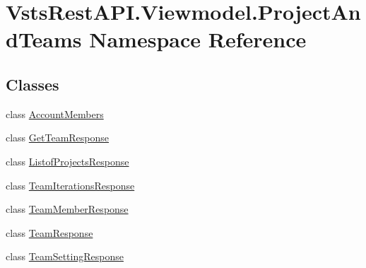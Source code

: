 \hypertarget{namespace_vsts_rest_a_p_i_1_1_viewmodel_1_1_project_and_teams}{}\section{Vsts\+Rest\+A\+P\+I.\+Viewmodel.\+Project\+And\+Teams Namespace Reference}
\label{namespace_vsts_rest_a_p_i_1_1_viewmodel_1_1_project_and_teams}
\subsection*{Classes}
\begin{DoxyCompactItemize}
\item 
class \mbox{\hyperlink{class_vsts_rest_a_p_i_1_1_viewmodel_1_1_project_and_teams_1_1_account_members}{Account\+Members}}
\item 
class \mbox{\hyperlink{class_vsts_rest_a_p_i_1_1_viewmodel_1_1_project_and_teams_1_1_get_team_response}{Get\+Team\+Response}}
\item 
class \mbox{\hyperlink{class_vsts_rest_a_p_i_1_1_viewmodel_1_1_project_and_teams_1_1_listof_projects_response}{Listof\+Projects\+Response}}
\item 
class \mbox{\hyperlink{class_vsts_rest_a_p_i_1_1_viewmodel_1_1_project_and_teams_1_1_team_iterations_response}{Team\+Iterations\+Response}}
\item 
class \mbox{\hyperlink{class_vsts_rest_a_p_i_1_1_viewmodel_1_1_project_and_teams_1_1_team_member_response}{Team\+Member\+Response}}
\item 
class \mbox{\hyperlink{class_vsts_rest_a_p_i_1_1_viewmodel_1_1_project_and_teams_1_1_team_response}{Team\+Response}}
\item 
class \mbox{\hyperlink{class_vsts_rest_a_p_i_1_1_viewmodel_1_1_project_and_teams_1_1_team_setting_response}{Team\+Setting\+Response}}
\end{DoxyCompactItemize}
